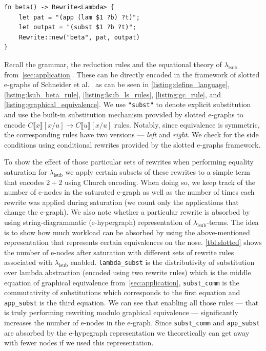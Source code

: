 \begin{listing}
	\begin{verbatim}
fn beta() -> Rewrite<Lambda> {
    let pat = "(app (lam $1 ?b) ?t)";
    let outpat = "(subst $1 ?b ?t)";
    Rewrite::new("beta", pat, outpat)
}
	\end{verbatim}
	\caption{$\lambda_{\text{lsub}}$ $d\beta$-rule}
	\label{listing:lsub_beta_rule}
\end{listing}


Recall the grammar, the reduction rules and the equational theory of $\lambda_{\text{lsub}}$ from~\autoref{sec:application}.
These can be directly encoded in the framework of slotted e-graphs of Schneider et al.~\cite{slotted-egraphs} as can be seen in \autoref{listing:define_language}, \autoref{listing:lsub_beta_rule}, \autoref{listing:lsub_ls_rules}, \autoref{listing:gc_rule}, and \autoref{listing:graphical_equivalence}.
We use \texttt{"subst"} to denote explicit substitution and use the built-in substitution mechanism provided by slotted e-graphs to encode $C\llbracket x \rrbracket[x / u] \to C\llbracket u \rrbracket[x/u]$ rules.
Notably, since equivalence is symmetric, the corresponding rules have two versions --- \textit{left} and \textit{right}.
We check for the side conditions using conditional rewrites provided by the slotted e-graphs framework.

To show the effect of those particular sets of rewrites when performing equality saturation for $\lambda_{\text{lsub}}$ we apply certain subsets of these rewrites to a simple term that encodes $2 + 2$ using Church encoding.
When doing so, we keep track of the number of e-nodes in the saturated e-graph as well as the number of times each rewrite was applied during saturation (we count only the applications that change the e-graph).
We also note whether a particular rewrite is absorbed by using string-diagrammatic (e-hypergraph) representation of $\lambda_{\text{lsub}}$-terms.
The idea is to show how much workload can be absorbed by using the above-mentioned representation that represents certain equivalences on the nose.
\autoref{tbl:slotted} shows the number of e-nodes after saturation with different sets of rewrite rules associated with $\lambda_{\text{lsub}}$ enabled.
\texttt{lambda\_subst} is the distributivity of substitution over lambda abstraction (encoded using two rewrite rules) which is the middle equation of graphical equivalence from~\autoref{sec:application}, \texttt{subst\_comm} is the commutativity of substitutions which corresponds to the first equation and \texttt{app\_subst} is the third equation.
We can see that enabling all those rules --- that is truly performing rewriting modulo graphical equivalence --- significantly increases the number of e-nodes in the e-graph.
Since \texttt{subst\_comm} and \texttt{app\_subst} are absorbed by the e-hypegraph representation we theoretically can get away with fewer nodes if we used this representation.

